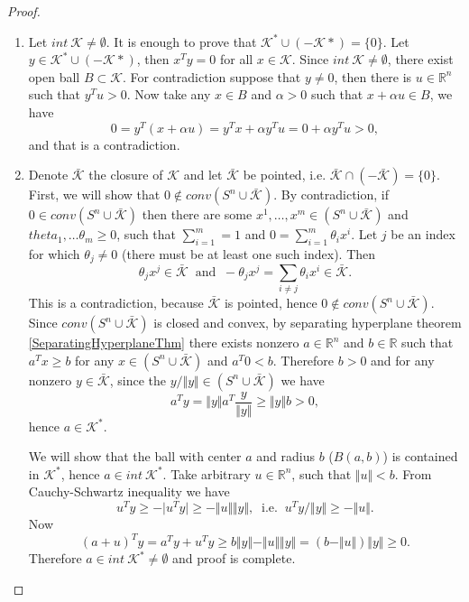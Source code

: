 \documentclass[12pt]{book}
\theoremstyle{definition}
\begin{document}
\begin{appendix}
\begin{proof}
\begin{enumerate}
\item Let $int \ \mathcal{K}\neq \emptyset$. It is enough to prove that $\mathcal{K}^* \cup (-\mathcal{K}*) = \{0\}.$ Let $y\in \mathcal{K}^* \cup (-\mathcal{K}*)$, then 
$x^Ty = 0 $ for all $x\in \mathcal{K}$. Since $int \ \mathcal{K}\neq \emptyset$, there exist open ball $B\subset \mathcal{K}$. For contradiction suppose that $y\neq 0$, then there is $u\in \mathbb{R}^n$ such that $y^Tu>0$. Now take any $x\in B$ and $\alpha>0$ such that $x+\alpha u\in B$, we have 
$$ 0 = y^T(x+\alpha u) = y^Tx + \alpha y^Tu = 0 + \alpha y^Tu > 0,$$
and that is a contradiction.


\item Denote $\bar{\mathcal{K}}$ the closure of $\mathcal{K}$ and let $\bar{\mathcal{K}}$ be pointed, i.e. 
$\bar{\mathcal{K}} \cap \left(-\bar{\mathcal{K}}\right) = \{0\}$. First, we will show that $0\notin conv(S^n\cup \bar{\mathcal{K}}).$ By contradiction, if $0\in conv(S^n\cup \bar{\mathcal{K}})$ then there are some 
$x^1,\dots ,x^m \in \left(S^n\cup \bar{\mathcal{K}}\right)$ and 
$theta_1,\dots \theta_m \geq 0$, such that $\sum_{i=1}^m = 1$ and $ 0 = \sum_{i=1}^m \theta_ix^i$.
Let $j$ be an index for which $\theta_j\neq 0$ (there must be at least one such index). Then 
\begin{equation*}
\theta_jx^j \in \bar{\mathcal{K}} \ \mbox{ and } \ -\theta_jx^j= \sum_{i\neq j} \theta_ix^i \in \bar{\mathcal{K}}.
\end{equation*}
This is a contradiction, because  $\bar{\mathcal{K}}$ is pointed, hence $0\notin conv(S^n\cup \bar{\mathcal{K}}).$
Since $conv(S^n\cup \bar{\mathcal{K}})$ is closed and convex, by separating hyperplane theorem \ref{SeparatingHyperplaneThm} there exists nonzero $a\in \mathbb{R}^n$ and $b\in \mathbb{R}$ such that 
$a^Tx \geq b$ for any $x\in (S^n\cup \bar{\mathcal{K}})$ and $a^T0<b$. Therefore $b>0$ and for any nonzero $y\in  \bar{\mathcal{K}}$, since the $y/\Vert y\Vert \in (S^n\cup \bar{\mathcal{K}})$
we have 
$$a^Ty = \Vert y \Vert a^T \frac{y}{\Vert y\Vert} \geq \Vert y\Vert b > 0,$$
hence $a\in \mathcal{K}^*$.  

We will show that the ball with center $a$ and radius $b$ ($B(a,b)$) is contained in $\mathcal{K}^*$, hence $a\in int \ \mathcal{K}^*$. Take arbitrary $u\in \mathbb{R}^n$, such that $\Vert u \Vert <b$. From Cauchy-Schwartz inequality we have
$$u^Ty \geq - \vert u^Ty \vert \geq -\Vert u \Vert \Vert y \Vert, \ \mbox{ i.e. } \ u^Ty/\Vert y \Vert \geq -\Vert u \Vert.$$ Now 
$$ (a+u)^Ty = a^Ty + u^Ty \geq b\Vert y \Vert - \Vert u \Vert \Vert y \Vert = (b - \Vert u \Vert)\Vert y \Vert\geq 0.$$
Therefore $a\in int\ \mathcal{K}^* \neq \emptyset$ and proof is complete.


\end{enumerate}
\end{proof}
\end{appendix}
\end{document}
